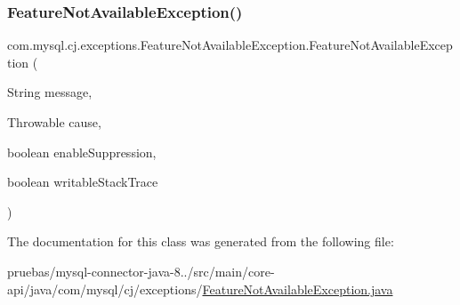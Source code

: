 \mbox{\label{classcom_1_1mysql_1_1cj_1_1exceptions_1_1_feature_not_available_exception_a6c69f78da4907a6a1faf8aad9d6a4d9e}} 
\subsubsection{\texorpdfstring{Feature\+Not\+Available\+Exception()}{FeatureNotAvailableException()}\hspace{0.1cm}{\footnotesize\ttfamily [5/5]}}
{\footnotesize\ttfamily com.\+mysql.\+cj.\+exceptions.\+Feature\+Not\+Available\+Exception.\+Feature\+Not\+Available\+Exception (\begin{DoxyParamCaption}\item[{String}]{message,  }\item[{Throwable}]{cause,  }\item[{boolean}]{enable\+Suppression,  }\item[{boolean}]{writable\+Stack\+Trace }\end{DoxyParamCaption})}



The documentation for this class was generated from the following file\+:\begin{DoxyCompactItemize}
\item 
pruebas/mysql-\/connector-\/java-\/8../src/main/core-\/api/java/com/mysql/cj/exceptions/\mbox{\hyperlink{_feature_not_available_exception_8java}{Feature\+Not\+Available\+Exception.\+java}}\end{DoxyCompactItemize}
